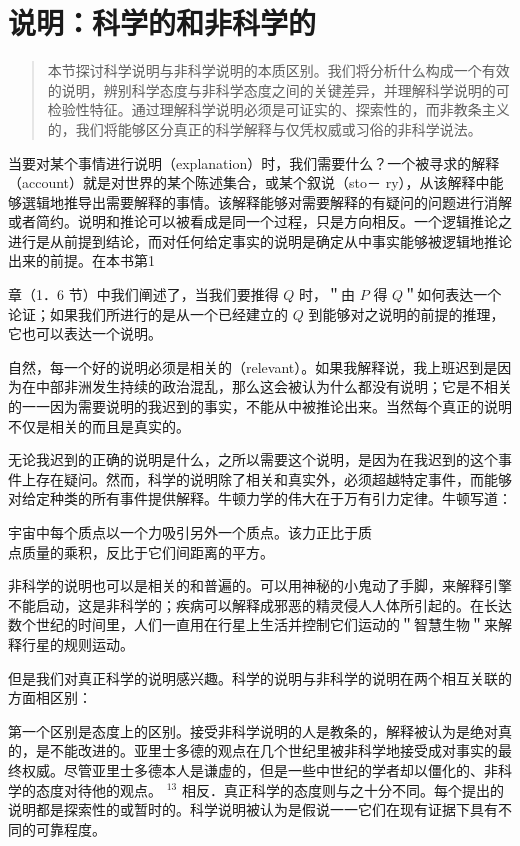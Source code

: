 \section{说明：科学的和非科学的}

\begin{quotation}
本节探讨科学说明与非科学说明的本质区别。我们将分析什么构成一个有效的说明，辨别科学态度与非科学态度之间的关键差异，并理解科学说明的可检验性特征。通过理解科学说明必须是可证实的、探索性的，而非教条主义的，我们将能够区分真正的科学解释与仅凭权威或习俗的非科学说法。
\end{quotation}

当要对某个事情进行说明（explanation）时，我们需要什么？一个被寻求的解释（account）就是对世界的某个陈述集合，或某个叙说（sto－ ry），从该解释中能够選辑地推导出需要解释的事情。该解释能够对需要解释的有疑问的问题进行消解或者简约。说明和推论可以被看成是同一个过程，只是方向相反。一个逻辑推论之进行是从前提到结论，而对任何给定事实的说明是确定从中事实能够被逻辑地推论出来的前提。在本书第1

章（1．6 节）中我们阐述了，当我们要推得 $Q$ 时，＂由 $P$ 得 $Q$＂如何表达一个论证；如果我们所进行的是从一个已经建立的 $Q$ 到能够对之说明的前提的推理，它也可以表达一个说明。

自然，每一个好的说明必须是相关的（relevant）。如果我解释说，我上班迟到是因为在中部非洲发生持续的政治混乱，那么这会被认为什么都没有说明；它是不相关的一一因为需要说明的我迟到的事实，不能从中被推论出来。当然每个真正的说明不仅是相关的而且是真实的。

无论我迟到的正确的说明是什么，之所以需要这个说明，是因为在我迟到的这个事件上存在疑问。然而，科学的说明除了相关和真实外，必须超越特定事件，而能够对给定种类的所有事件提供解释。牛顿力学的伟大在于万有引力定律。牛顿写道：

\begin{displayquote}
宇宙中每个质点以一个力吸引另外一个质点。该力正比于质\\
点质量的乘积，反比于它们间距离的平方。
\end{displayquote}

非科学的说明也可以是相关的和普遍的。可以用神秘的小鬼动了手脚，来解释引擎不能启动，这是非科学的；疾病可以解释成邪恶的精灵侵人人体所引起的。在长达数个世纪的时间里，人们一直用在行星上生活并控制它们运动的＂智慧生物＂来解释行星的规则运动。

但是我们对真正科学的说明感兴趣。科学的说明与非科学的说明在两个相互关联的方面相区别：

第一个区别是态度上的区别。接受非科学说明的人是教条的，解释被认为是绝对真的，是不能改进的。亚里士多德的观点在几个世纪里被非科学地接受成对事实的最终权威。尽管亚里士多德本人是谦虚的，但是一些中世纪的学者却以僵化的、非科学的态度对待他的观点。 ${ }^{13}$ 相反．真正科学的态度则与之十分不同。每个提出的说明都是探索性的或暂时的。科学说明被认为是假说一一它们在现有证据下具有不同的可靠程度。

